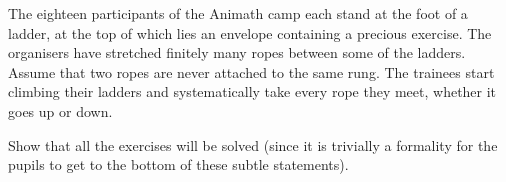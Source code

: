 The eighteen participants of the Animath camp each stand at the foot of a ladder, at the top of which lies an envelope containing a precious exercise. The organisers have stretched finitely many ropes between some of the ladders. Assume that two ropes are never attached to the same rung. The trainees start climbing their ladders and systematically take every rope they meet, whether it goes up or down.

Show that all the exercises will be solved (since it is trivially a formality for the pupils to get to the bottom of these subtle statements).
